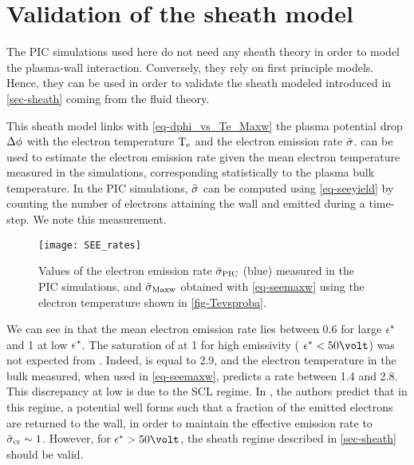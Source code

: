 
\section{Validation of the sheath model }
  \label{sec-sheath_validation}
  
  The \ac{PIC} simulations used here do not need any sheath theory in order to model the plasma-wall interaction.
  Conversely, they rely on first principle models.
  Hence, they can be used in order to validate the sheath modeled introduced in \cref{sec-sheath} coming from the fluid theory.
  
  This sheath model links with \cref{eq-dphi_vs_Te_Maxw} the plasma potential drop $\Delta \phi$ with the electron temperature $\mathrm{T_e}$ and the electron emission rate $ \bar{\sigma }$.
   can be used to estimate the electron emission rate given the mean electron temperature measured in the simulations, corresponding statistically to the plasma bulk temperature.   
  In the \ac{PIC} simulations, $ \bar{\sigma }$ can be computed using \cref{eq-seeyield} by counting the number of electrons attaining the wall and emitted during a time-step.
  We note \ratepic this measurement.
  \vspace{1em}
   
  \begin{figure}[hbtp]
    \centering
    \texttt{[image: SEE\_rates]}
    \caption{Values of the electron emission rate $ \bar{\sigma }_{\rm PIC}$ (blue) measured in the \ac{PIC} simulations, and $  \bar{\sigma }_{\rm Maxw}$ obtained with \cref{eq-seemaxw} using the electron temperature shown in \cref{fig-Tevsproba}. }
    \label{fig-seeparamesMaxw}
  \end{figure}
  
  
  We can see in  that the mean electron emission rate lies between 0.6 for large $\epsilon^{*}$ and 1 at low $\epsilon^{*}$.
  The saturation of \ratepic at 1 for high emissivity ( $\crover < 50 \volt$) was not expected from \ratemaxw.
  Indeed, \probamax is equal to 2.9, and the electron temperature in the bulk measured, when used in \cref{eq-seemaxw}, predicts a rate between 1.4 and 2.8.
  This discrepancy at low \crover is due to the \ac{SCL} regime.
  In \citet{hobbs1967}, the authors predict that in this regime, a potential well forms such that a fraction of the emitted electrons are returned to the wall, in order to maintain the effective emission rate to $ \bar{\sigma }_{\rm cr}\sim1$.
  However, for $\crover > 50 \volt$, the sheath regime described in \cref{sec-sheath} should be valid.
   
